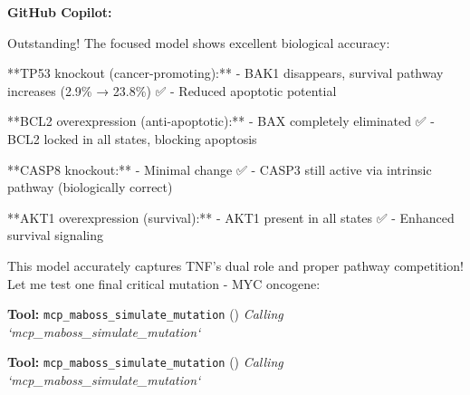 \documentclass[11pt,a4paper]{article}
\begin{document}
\begin{copilotbox}
\textbf{GitHub Copilot:}

Outstanding! The focused model shows excellent biological accuracy:

**TP53 knockout (cancer-promoting):**
- BAK1 disappears, survival pathway increases (2.9\% → 23.8\%) ✅
- Reduced apoptotic potential

**BCL2 overexpression (anti-apoptotic):**  
- BAX completely eliminated ✅
- BCL2 locked in all states, blocking apoptosis

**CASP8 knockout:**
- Minimal change ✅  
- CASP3 still active via intrinsic pathway (biologically correct)

**AKT1 overexpression (survival):**
- AKT1 present in all states ✅
- Enhanced survival signaling

This model accurately captures TNF's dual role and proper pathway competition! Let me test one final critical mutation - MYC oncogene:

\end{copilotbox}
\begin{toolokbox}
\textbf{Tool:} \texttt{mcp\_maboss\_simulate\_mutation} (\checkmark)
\textit{Calling `mcp\_maboss\_simulate\_mutation`}
\end{toolokbox}
\begin{toolokbox}
\textbf{Tool:} \texttt{mcp\_maboss\_simulate\_mutation} (\checkmark)
\textit{Calling `mcp\_maboss\_simulate\_mutation`}
\end{toolokbox}
\end{document}
